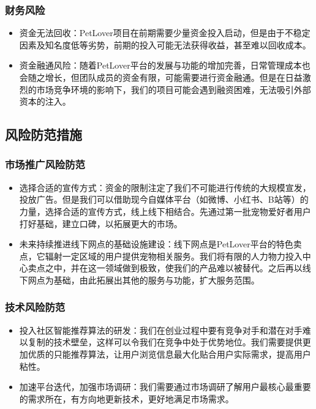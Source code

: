 \documentclass[a4paper]{ctexart}
\begin{document}
\subsubsection{财务风险}
\begin{itemize}
  \item 资金无法回收：PetLover项目在前期需要少量资金投入启动，但是由于不稳定因素及知名度低等劣势，前期的投入可能无法获得收益，甚至难以回收成本。
  \item 资金融通风险：随着PetLover平台的发展与功能的增加完善，日常管理成本也会随之增长，但团队成员的资金有限，可能需要进行资金融通。但是在日益激烈的市场竞争环境的影响下，我们的项目可能会遇到融资困难，无法吸引外部资本的注入。
\end{itemize}

\subsection{风险防范措施}

\subsubsection{市场推广风险防范}
\begin{itemize}
  \item 选择合适的宣传方式：资金的限制注定了我们不可能进行传统的大规模宣发，投放广告。但是我们可以借助现今自媒体平台（如微博、小红书、B站等）的力量，选择合适的宣传方式，线上线下相结合。先通过第一批宠物爱好者用户打好基础，建立口碑，以拓展更大的市场。
  \item 未来持续推进线下网点的基础设施建设：线下网点是PetLover平台的特色卖点，它辐射一定区域的用户提供宠物相关服务。我们将有限的人力物力投入中心卖点之中，并在这一领域做到极致，使我们的产品难以被替代。之后再以线下网点为基础，由此拓展出其他的服务与功能，扩大服务范围。
\end{itemize}
\subsubsection{技术风险防范}
\begin{itemize}
  \item 投入社区智能推荐算法的研发：我们在创业过程中要有竞争对手和潜在对手难以复制的技术壁垒，这样可以令我们在竞争中处于优势地位。我们需要提供更加优质的只能推荐算法，让用户浏览信息最大化贴合用户实际需求，提高用户粘性。
  \item 加速平台迭代，加强市场调研：我们需要通过市场调研了解用户最核心最重要的需求所在，有方向地更新技术，更好地满足市场需求。
\end{itemize}
\end{document}
